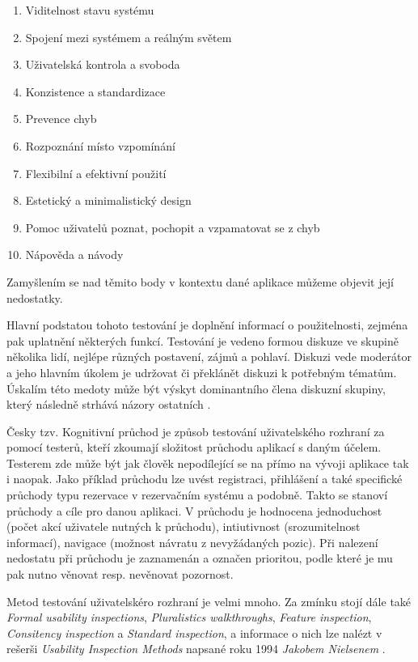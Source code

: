 \documentclass[twoside,12pt]{article}
\begin{document}
\begin{enumerate}
\item Viditelnost stavu systému
\item Spojení mezi systémem a reálným světem
\item Uživatelská kontrola a svoboda
\item Konzistence a standardizace
\item Prevence chyb
\item Rozpoznání místo vzpomínání
\item Flexibilní a efektivní použití
\item Estetický a minimalistický design
\item Pomoc uživatelů poznat, pochopit a vzpamatovat se z chyb
\item Nápověda a návody
\end{enumerate} 

Zamyšlením se nad těmito body v kontextu dané aplikace můžeme objevit její nedostatky.

Hlavní podstatou tohoto testování je doplnění informací o použitelnosti, zejména pak uplatnění některých funkcí. Testování je vedeno formou diskuze ve skupině několika lidí, nejlépe různých postavení, zájmů a pohlaví. Diskuzi vede moderátor a jeho hlavním úkolem je udržovat či překlánět diskuzi k potřebným tématům. Úskalím této medoty může být výskyt dominantního člena diskuzní skupiny, který následně strhává názory ostatních \cite{nielsen_focus_groups}.

Česky tzv. Kognitivní průchod je způsob testování uživatelského rozhraní za pomocí testerů, kteří zkoumají složitost průchodu aplikací s daným účelem. Testerem zde může být jak člověk nepodílející se na přímo na vývoji aplikace tak i naopak. Jako příklad průchodu lze uvést registraci, přihlášení a také specifické průchody typu rezervace v rezervačním systému a podobně. Takto se stanoví průchody a cíle pro danou aplikaci. V průchodu je hodnocena jednoduchost (počet akcí uživatele nutných k průchodu), intiutivnost (srozumitelnost informací), navigace (možnost návratu z nevyžádaných pozic). Při nalezení nedostatu při průchodu je zaznamenán a označen prioritou, podle které je mu pak nutno věnovat resp. nevěnovat pozornost. 

Metod testování uživatelskéro rozhraní je velmi mnoho. Za zmínku stojí dále také \textit{Formal usability inspections}, \textit{Pluralistics walkthroughs}, \textit{Feature inspection}, \textit{Consitency inspection} a \textit{Standard inspection}, a informace o nich lze nalézt v rešerši \textit{Usability Inspection Methods} napsané roku 1994 \textit{Jakobem Nielsenem} \cite{nielsen_methods}. 
\end{document}
